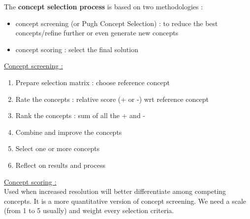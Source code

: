 \documentclass[../main.tex]{subfiles}
\begin{document}
The \textbf{concept selection process} is based on two methodologies : \begin{itemize}
    \item concept screening (or Pugh Concept Selection) : to reduce the best concepts/refine further or even generate new concepts\\
    \item concept scoring : select the final solution\\
\end{itemize}

\quad \underline{Concept screening :}
\begin{enumerate}
    \item Prepare selection matrix : choose reference concept\\
    \item Rate the concepts : relative score (+ or -) wrt reference concept\\
    \item Rank the concepts : sum of all the + and -\\
    \item Combine and improve the concepts\\
    \item Select one or more concepts\\
    \item Reflect on results and process\\
\end{enumerate}

\quad \underline{Concept scoring :}\\
Used when increased resolution will better differentiate among competing concepts. It is a more quantitative version of concept screening. We need a scale (from 1 to 5 usually) and weight every selection criteria.\\
\end{document}
